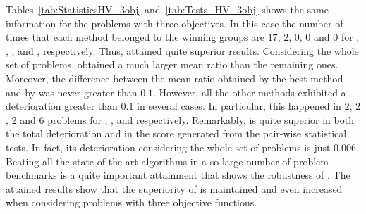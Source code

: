 Tables~\ref{tab:StatisticsHV_3obj} and~\ref{tab:Tests_HV_3obj} shows the same information for the problems with three objectives.
%
In this case the number of times that each method belonged to the winning groups are $17$, $2$, $0$, $0$ and $0$ 
for \AVSDMOEAD{}, \RMOEA{}, \MOEADDE{}, \NSGAIII{} and \NSGAII{}, respectively.
%
Thus, \AVSDMOEAD{} attained quite superior results.
%
Considering the whole set of problems, \AVSDMOEAD{} obtained a much larger mean \HV{} ratio than the remaining ones.
%
Moreover, the difference between the mean \HV{} ratio obtained by the best method and by \AVSDMOEAD{} was never greater than $0.1$.
%
However, all the other methods exhibited a deterioration greater than $0.1$ in several cases.
%
In particular, this happened in $2$, $2$, $2$ and $6$ problems for \MOEADDE{}, \RMOEA{}, \NSGAIII{} and \NSGAII{} respectively.
%
Remarkably, \AVSDMOEAD{} is quite superior in both the total deterioration and in the score generated from the pair-wise
statistical tests.
%
In fact, its deterioration considering the whole set of problems is just $0.006$.
%
Beating all the state of the art algorithms in a so large number of problem benchmarks is a quite important attainment that shows
the robustness of \AVSDMOEAD{}.
%
%
The attained results show that the superiority of \AVSDMOEAD{} is maintained and even increased when considering 
problems with three objective functions.
%
%
%
%



